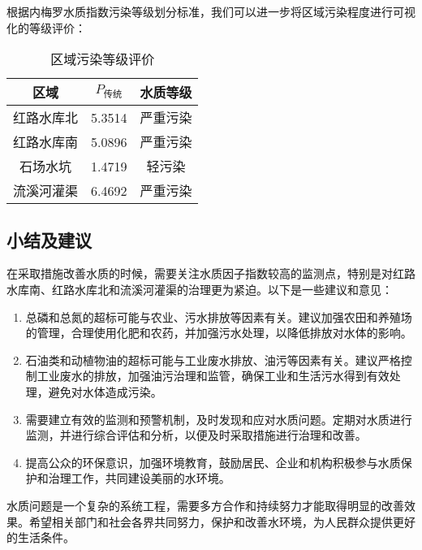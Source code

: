 根据内梅罗水质指数污染等级划分标准，我们可以进一步将区域污染程度进行可视化的等级评价：
\begin{table}[H]
    \centering
    \caption{区域污染等级评价}
      \begin{tabular}{ccc}
      \toprule
      区域    & $P_{\text{传统}}$   & 水质等级 \\
      \midrule
      红路水库北 & 5.3514  & 严重污染 \\
      红路水库南 & 5.0896  & 严重污染 \\
      石场水坑  & 1.4719  & 轻污染 \\
      流溪河灌渠 & 6.4692  & 严重污染 \\
      \bottomrule
      \end{tabular}%
    \label{tab:Regional pollution level evaluation}%
\end{table}%



\subsection{小结及建议}

在采取措施改善水质的时候，需要关注水质因子指数较高的监测点，特别是对红路水库南、红路水库北和流溪河灌渠的治理更为紧迫。以下是一些建议和意见：
\begin{enumerate}
    \item 总磷和总氮的超标可能与农业、污水排放等因素有关。建议加强农田和养殖场的管理，合理使用化肥和农药，并加强污水处理，以降低排放对水体的影响。
    \item 石油类和动植物油的超标可能与工业废水排放、油污等因素有关。建议严格控制工业废水的排放，加强油污治理和监管，确保工业和生活污水得到有效处理，避免对水体造成污染。
    \item 需要建立有效的监测和预警机制，及时发现和应对水质问题。定期对水质进行监测，并进行综合评估和分析，以便及时采取措施进行治理和改善。
    \item 提高公众的环保意识，加强环境教育，鼓励居民、企业和机构积极参与水质保护和治理工作，共同建设美丽的水环境。
\end{enumerate}

水质问题是一个复杂的系统工程，需要多方合作和持续努力才能取得明显的改善效果。希望相关部门和社会各界共同努力，保护和改善水环境，为人民群众提供更好的生活条件。

